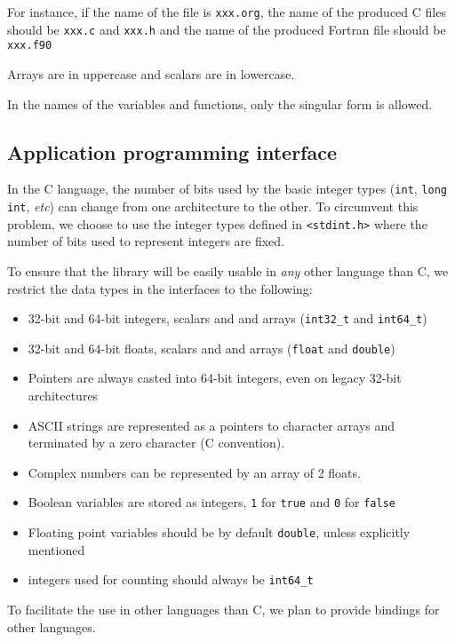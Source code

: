 For instance, if the name of the {\orgmode} file is
\texttt{xxx.org}, the name of the produced C files should
be \texttt{xxx.c} and \texttt{xxx.h} and the
name of the produced Fortran file should be
\texttt{xxx.f90}

Arrays are in uppercase and scalars are in lowercase.

In the  names of  the variables and  functions, only the singular
form is allowed.

\subsection{Application programming interface}

In the C language, the number of bits used by the basic integer types
(\texttt{int}, \texttt{long int}, \textit{etc}) can
change from one architecture to the other. To circumvent this
problem, we choose to use the integer types defined in
\texttt{<stdint.h>} where the number of bits used to represent
integers are fixed.

To ensure that the library will be easily usable in \emph{any} other
language than C, we restrict the data types in the interfaces to the
following:
\begin{itemize}
\item 32-bit and 64-bit integers, scalars and and arrays
  (\texttt{int32_t} and \texttt{int64_t})
\item 32-bit and 64-bit floats, scalars and and arrays
  (\texttt{float} and \texttt{double})
\item Pointers are always casted into 64-bit integers, even on legacy 32-bit architectures
\item ASCII strings are represented as a pointers to character arrays
  and terminated by a zero character (C convention).
\item Complex numbers can be represented by an array of 2 floats.
\item Boolean variables are stored as integers, \texttt{1} for
\texttt{true} and \texttt{0} for \texttt{false}
\item Floating point variables should be by default
\texttt{double}, unless explicitly mentioned
\item integers used for counting should always be \texttt{int64_t}
\end{itemize}

To facilitate the  use in other languages than C, we plan to provide 
bindings for other languages.


